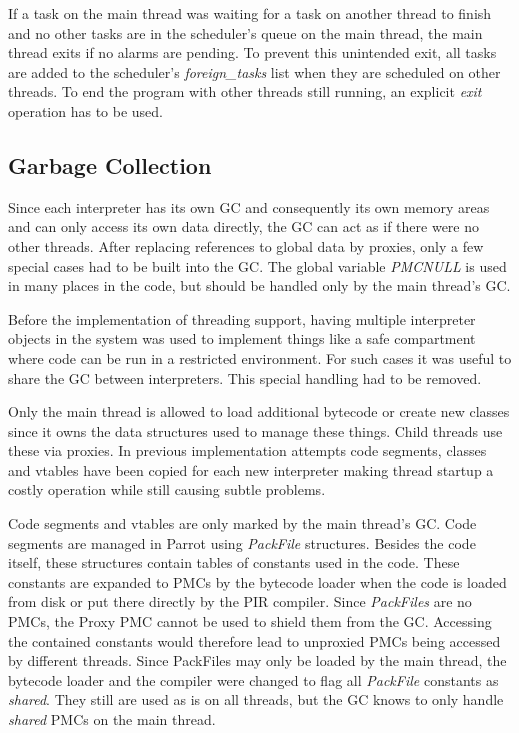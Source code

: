 \documentclass[bachelor,english]{hgbthesis}
\begin{document}
If a task on the main thread was waiting for a task on another thread to finish and no other tasks are in the scheduler's queue on the main thread, the main thread exits if no alarms are pending. To prevent this unintended exit, all tasks are added to the scheduler's \textit{foreign\_tasks} list when they are scheduled on other threads. To end the program with other threads still running, an explicit \textit{exit} operation has to be used.

\subsection{Garbage Collection}

Since each interpreter has its own GC and consequently its own memory areas and can only access its own data directly, the GC can act as if there were no other threads. After replacing references to global data by proxies, only a few special cases had to be built into the GC. The global variable \textit{PMCNULL} is used in many places in the code, but should be handled only by the main thread's GC.

Before the implementation of threading support, having multiple interpreter objects in the system was used to implement things like a safe compartment where code can be run in a restricted environment. For such cases it was useful to share the GC between interpreters. This special handling had to be removed.

Only the main thread is allowed to load additional bytecode or create new classes since it owns the data structures used to manage these things. Child threads use these via proxies. In previous implementation attempts code segments, classes and vtables have been copied for each new interpreter making thread startup a costly operation while still causing subtle problems.

Code segments and vtables are only marked by the main thread's GC. Code segments are managed in Parrot using \textit{PackFile} structures. Besides the code itself, these structures contain tables of constants used in the code. These constants are expanded to PMCs by the bytecode loader when the code is loaded from disk or put there directly by the PIR compiler. Since \textit{PackFiles} are no PMCs, the Proxy PMC cannot be used to shield them from the GC. Accessing the contained constants would therefore lead to unproxied PMCs being accessed by different threads. Since PackFiles may only be loaded by the main thread, the bytecode loader and the compiler were changed to flag all \textit{PackFile} constants as \textit{shared}. They still are used as is on all threads, but the GC knows to only handle \textit{shared} PMCs on the main thread.
\end{document}
